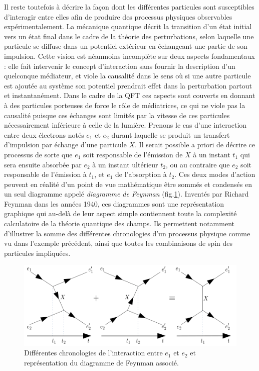         Il reste toutefois à décrire la façon dont les différentes particules sont susceptibles d'interagir entre elles afin de produire des processus physiques observables expérimentalement. La mécanique quantique décrit la transition d'un état initial vers un état final dans le cadre de la théorie des perturbations, selon laquelle une particule se diffuse dans un potentiel extérieur en échangeant une partie de son impulsion. Cette vision est néanmoins incomplète sur deux aspects fondamentaux : elle fait intervenir le concept d'interaction sans fournir la description d'un quelconque médiateur, et viole la causalité dans le sens où si une autre particule est ajoutée au système son potentiel prendrait effet dans la perturbation partout et instantanément. Dans le cadre de la QFT ces aspects sont couverts en donnant à des particules porteuses de force le rôle de médiatrices, ce qui ne viole pas la causalité puisque ces échanges sont limités par la vitesse de ces particules nécessairement inférieure à celle de la lumière. Prenons le cas d'une interaction entre deux électrons notés $e_1$ et $e_2$ durant laquelle se produit un transfert d'impulsion par échange d'une particule $X$. Il serait possible a priori de décrire ce processus de sorte que $e_1$ soit responsable de l'émission de $X$ à un instant $t_1$ qui sera ensuite absorbée par $e_2$ à un instant ultérieur $t_2$, ou au contraire que $e_2$ soit responsable de l'émission à $t_1$, et $e_1$ de l'absorption à $t_2$. Ces deux modes d'action peuvent en réalité d'un point de vue mathématique être sommés et condensés en un seul diagramme appelé \textit{diagramme de Feynman} (fig.\ref{sumfeynman}). Inventés par Richard Feynman dans les années 1940, ces diagrammes sont une représentation graphique qui au-delà de leur aspect simple contiennent toute la complexité calculatoire de la théorie quantique des champs. Ils permettent notamment d'illustrer la somme des différentes  chronologies d'un processus physique comme vu dans l'exemple précédent, ainsi que toutes les combinaisons de spin des particules impliquées. \\
        
        \begin{figure}
            \centering
            \includegraphics[scale=0.28]{Chapitre1/Images/sumfeynman.png} 
            \caption{Différentes chronologies de l'interaction entre $e_1$ et $e_2$ et représentation du diagramme de Feynman associé.}
        \label{sumfeynman}
        \end{figure}
        
